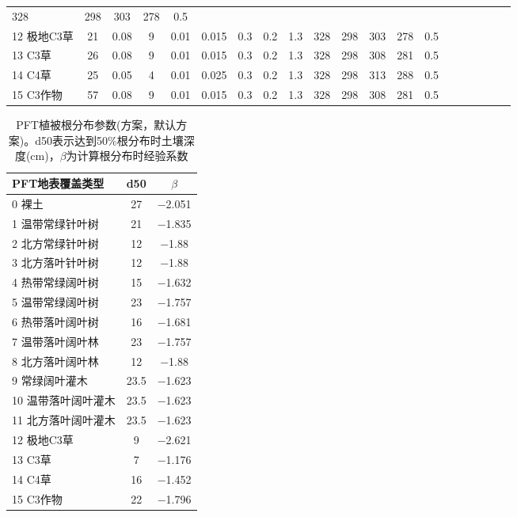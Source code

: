 \begin{landscape}
\begin{table}[htbp]
\begin{tabular}{@{}lccccccccccccccccccc@{}}
328 & 298 & 303 & 278 & 0.5 \\
12 极地C3草 & 21 & 0.08 & 9 & 0.01 & 0.015 & 0.3 & 0.2 & 1.3 & 328 & 298
& 303 & 278 & 0.5 \\
13 C3草 & 26 & 0.08 & 9 & 0.01 & 0.015 & 0.3 & 0.2 & 1.3 & 328 & 298 &
308 & 281 & 0.5 \\
14 C4草 & 25 & 0.05 & 4 & 0.01 & 0.025 & 0.3 & 0.2 & 1.3 & 328 & 298 &
313 & 288 & 0.5 \\
15 C3作物 & 57 & 0.08 & 9 & 0.01 & 0.015 & 0.3 & 0.2 & 1.3 & 328 & 298 &
308 & 281 & 0.5 \\ \bottomrule
        \end{tabular}
\end{table}
\end{landscape}

\begin{table}[htbp]
    \centering
    \caption[PFT植被根分布参数(\citet{schenk2002rooting}方案)]{PFT植被根分布参数(\citet{schenk2002rooting}方案，默认方案)。d50表示达到50\%根分布时土壤深度(cm)，$\beta$为计算根分布时经验系数}
    \label{tab:PFTSchenkANDJackson2002方案默认方案}
   \begin{tabular}{@{}lcc@{}}
    \toprule
    PFT地表覆盖类型     & d50  & $\beta$ \\ \midrule
    0 裸土        & 27   & \num { -2.051 } \\
    1 温带常绿针叶树   & 21   & \num { -1.835 } \\
    2 北方常绿针叶树   & 12   & \num { -1.88  } \\
    3 北方落叶针叶树   & 12   & \num { -1.88  } \\
    4 热带常绿阔叶树   & 15   & \num { -1.632 } \\
    5 温带常绿阔叶树   & 23   & \num { -1.757 } \\
    6 热带落叶阔叶树   & 16   & \num { -1.681 } \\
    7 温带落叶阔叶林   & 23   & \num { -1.757 } \\
    8 北方落叶阔叶林   & 12   & \num { -1.88  } \\
    9 常绿阔叶灌木    & 23.5 & \num { -1.623 } \\
    10 温带落叶阔叶灌木 & 23.5 & \num { -1.623 } \\
    11 北方落叶阔叶灌木 & 23.5 & \num { -1.623 } \\
    12 极地C3草    & 9    & \num { -2.621 } \\
    13 C3草      & 7    & \num { -1.176 } \\
    14 C4草      & 16   & \num { -1.452 } \\
    15 C3作物     & 22   & \num { -1.796 } \\ \bottomrule
\end{tabular}
\end{table}


